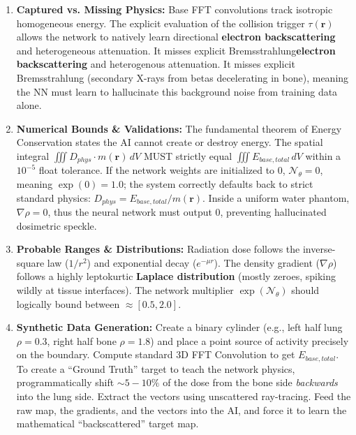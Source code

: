 \documentclass[11pt,a4paper]{article}
\begin{document}
\begin{enumerate}
    \item \textbf{Captured vs. Missing Physics:} Base FFT convolutions track isotropic homogeneous energy. The explicit evaluation of the collision trigger $\tau(\mathbf{r})$ allows the network to natively learn directional \textbf{electron backscattering} and heterogeneous attenuation. It misses explicit Bremsstrahlung\textbf{electron backscattering} and heterogenous attenuation. It misses explicit Bremsstrahlung (secondary X-rays from betas decelerating in bone), meaning the NN must learn to hallucinate this background noise from training data alone.
    \item \textbf{Numerical Bounds \& Validations:} The fundamental theorem of Energy Conservation states the AI cannot create or destroy energy. The spatial integral $\iiint D_{phys} \cdot m(\mathbf{r}) \, dV$ MUST strictly equal $\iiint E_{base,total} \, dV$ within a $10^{-5}$ float tolerance. If the network weights are initialized to 0, $\mathcal{N}_\theta = 0$, meaning $\exp(0) = 1.0$; the system correctly defaults back to strict standard physics: $D_{phys} = E_{base,total}/m(\mathbf{r})$. Inside a uniform water phantom, $\nabla\rho = 0$, thus the neural network must output $0$, preventing hallucinated dosimetric speckle.
    \item \textbf{Probable Ranges \& Distributions:} Radiation dose follows the inverse-square law ($1/r^2$) and exponential decay ($e^{-\mu r}$). The density gradient ($\nabla\rho$) follows a highly leptokurtic \textbf{Laplace distribution} (mostly zeroes, spiking wildly at tissue interfaces). The network multiplier $\exp(\mathcal{N}_\theta)$ should logically bound between $\approx [0.5, 2.0]$.
    \item \textbf{Synthetic Data Generation:} Create a binary cylinder (e.g., left half lung $\rho=0.3$, right half bone $\rho=1.8$) and place a point source of activity precisely on the boundary. Compute standard 3D FFT Convolution to get $E_{base,total}$. To create a ``Ground Truth'' target to teach the network physics, programmatically shift $\sim 5-10\%$ of the dose from the bone side \textit{backwards} into the lung side. Extract the vectors using unscattered ray-tracing. Feed the raw map, the gradients, and the vectors into the AI, and force it to learn the mathematical ``backscattered'' target map.
\end{enumerate}
\end{document}
